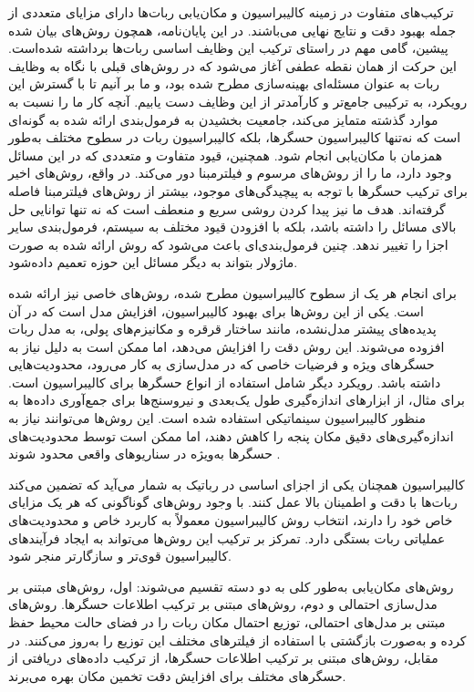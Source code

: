 ترکیب‌های متفاوت در زمینه کالیبراسیون و مکان‌یابی ربات‌ها دارای مزایای متعددی از جمله بهبود دقت و نتایج نهایی می‌باشند. در این پایان‌نامه، همچون روش‌های بیان شده پیشین، گامی مهم در راستای ترکیب این وظایف اساسی ربات‌ها برداشته‌ شده‌است. این حرکت از همان نقطه عطفی آغاز می‌شود که در روش‌های قبلی با نگاه به وظایف ربات به عنوان مسئله‌ای بهینه‌سازی مطرح شده بود، و ما بر آنیم تا با گسترش این رویکرد، به ترکیبی جامع‌تر و کارآمدتر از این وظایف دست یابیم. آنچه کار ما را نسبت به موارد گذشته متمایز می‌کند، جامعیت بخشیدن به فرمول‌بندی ارائه شده به گونه‌ای است که نه‌تنها کالیبراسیون حسگرها، بلکه کالیبراسیون ربات در سطوح مختلف به‌طور همزمان با مکان‌یابی انجام شود. همچنین، قیود متفاوت و متعددی که در این مسائل وجود دارد، ما را از روش‌های مرسوم و فیلترمبنا دور می‌کند. در واقع، روش‌های اخیر برای ترکیب حسگرها با توجه به پیچیدگی‌های موجود، بیشتر از روش‌های فیلترمبنا فاصله گرفته‌اند. هدف ما نیز پیدا کردن روشی سریع و منعطف است که نه تنها توانایی حل بالای مسائل را داشته باشد، بلکه با افزودن قیود مختلف به سیستم، فرمول‌بندی سایر اجزا را تغییر ندهد. چنین فرمول‌بندی‌ای باعث می‌شود که روش ارائه شده به صورت ماژولار بتواند به دیگر مسائل این حوزه تعمیم داده‌شود. 

برای انجام هر یک از سطوح کالیبراسیون مطرح شده، روش‌های خاصی نیز ارائه شده است. یکی از این روش‌ها برای بهبود کالیبراسیون، افزایش مدل است که در آن پدیده‌های پیشتر مدل‌نشده، مانند ساختار قرقره و مکانیزم‌های پولی، به مدل ربات افزوده می‌شوند. این روش دقت را افزایش می‌دهد، اما ممکن است به دلیل نیاز به حسگرهای ویژه و فرضیات خاصی که در مدل‌سازی به کار می‌رود، محدودیت‌هایی داشته باشد. رویکرد دیگر شامل استفاده از انواع حسگرها برای کالیبراسیون است. برای مثال، از ابزارهای اندازه‌گیری طول یک‌بعدی و نیرو‌سنج‌ها برای جمع‌آوری داده‌ها به منظور کالیبراسیون سینماتیکی استفاده شده است. این روش‌ها می‌توانند نیاز به اندازه‌گیری‌های دقیق مکان پنجه را کاهش دهند، اما ممکن است توسط محدودیت‌های حسگرها به‌ویژه در سناریوهای واقعی محدود شوند
\cite{elatta2004overview, roth1987overview}. 

کالیبراسیون همچنان یکی از اجزای اساسی در رباتیک به شمار می‌آید که تضمین می‌کند ربات‌ها با دقت و اطمینان بالا عمل کنند. با وجود روش‌های گوناگونی که هر یک مزایای خاص خود را دارند، انتخاب روش کالیبراسیون معمولاً به کاربرد خاص و محدودیت‌های عملیاتی ربات بستگی دارد. تمرکز بر ترکیب این روش‌ها می‌تواند به ایجاد فرآیندهای کالیبراسیون قوی‌تر و سازگارتر منجر شود.

روش‌های مکان‌یابی به‌طور کلی به دو دسته تقسیم می‌شوند: اول، روش‌های مبتنی بر مدل‌سازی احتمالی و دوم، روش‌های مبتنی بر ترکیب اطلاعات حسگرها. روش‌های مبتنی بر مدل‌های احتمالی، توزیع احتمال مکان ربات را در فضای حالت محیط حفظ کرده و به‌صورت بازگشتی با استفاده از فیلترهای مختلف این توزیع را به‌روز می‌کنند. در مقابل، روش‌های مبتنی بر ترکیب اطلاعات حسگرها، از ترکیب داده‌های دریافتی از حسگرهای مختلف برای افزایش دقت تخمین مکان بهره می‌برند.

